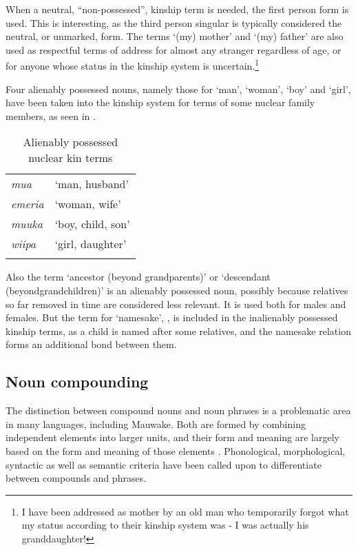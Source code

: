 \largerpage	
When a neutral, ``non-possessed'', kinship term is needed, the first person form is used. This is interesting, as the third person singular is typically considered the neutral, or unmarked, form. The terms `(my) mother' and `(my) father' are also used as respectful terms of address for almost any stranger regardless of age, or for anyone whose status in the kinship system is uncertain.\footnote{I have been addressed as {\textquotedbl}mother{\textquotedbl} by an old man who temporarily forgot what my status according to their kinship system was - I was actually his granddaughter!}

Four alienably possessed nouns, namely those for `man', `woman', `boy' and `girl', have been taken into the kinship system for terms of some nuclear family members, as seen in . 

\begin{table} 
\caption{Alienably possessed nuclear kin terms}
\label{tab:3:alposs}

\begin{tabular}{>{\itshape}ll}
\mytoprule
mua &`man, husband'\\
emeria &`woman, wife'\\
muuka &`boy, child, son'\\
wiipa &`girl, daughter'\\
\mybottomrule
\end{tabular}
\end{table}


Also the term  `ancestor (beyond grandparents)' or `descendant (beyond\linebreak grandchildren)' is an alienably possessed noun, possibly because relatives so far removed in time are considered less relevant. It is used both for males and females. But the term for `namesake', , is included in the inalienably possessed kinship terms, as a child is named after some relatives, and the namesake relation forms an additional bond between them.

\subsection{Noun compounding}\label{sec:3.2.5}
{}
The distinction between compound nouns and noun phrases is a problematic area in many languages, including Mauwake. Both are formed by combining independent elements into larger units, and their form and meaning are largely based on the form and meaning of those elements \citep[40]{Anderson1985a}. Phonological, morphological, syntactic as well as semantic criteria have been called upon to differentiate between compounds and phrases.

